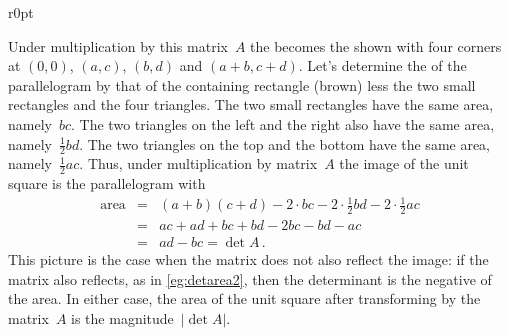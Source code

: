 \begin{wrapfigure}{r}{0pt} 
\end{wrapfigure}
Under multiplication by this matrix~\(A\) the  becomes the  shown with four corners at \((0,0)\), \((a,c)\), \((b,d)\) and \((a+b,c+d)\).
Let's determine the  of the parallelogram by that of the containing rectangle (brown) less the two small rectangles and the four triangles.
The two small rectangles have the same area, namely~\(bc\).
The two triangles on the left and the right also have the same area, namely~\(\frac12bd\).
The two triangles on the top and the bottom have the same area, namely~\(\frac12ac\).
Thus, under multiplication by matrix~\(A\) the image of the unit square is the parallelogram with 
\begin{eqnarray*}
\text{area}&=&(a+b)(c+d)-2\cdot bc-2\cdot\frac12bd-2\cdot\frac12ac
\\&=&ac+ad+bc+bd-2bc-bd-ac
\\&=&ad-bc=\det A\,.
\end{eqnarray*}
This picture is the case when the matrix does not also reflect the image:  if the matrix also reflects, as in \autoref{eg:detarea2}, then the determinant is the negative of the area.
In either case, the area of the unit square after transforming by the matrix~\(A\) is the magnitude~\(|\det A|\).


